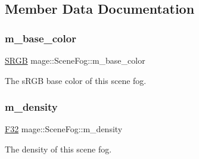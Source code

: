 \subsection{Member Data Documentation}
\hypertarget{classmage_1_1_scene_fog_aa5440867e5dc3dda9532899e98ff44ae}{}\label{classmage_1_1_scene_fog_aa5440867e5dc3dda9532899e98ff44ae} 
\subsubsection{\texorpdfstring{m\+\_\+base\+\_\+color}{m\_base\_color}}
{\footnotesize\ttfamily \hyperlink{structmage_1_1_s_r_g_b}{S\+R\+GB} mage\+::\+Scene\+Fog\+::m\+\_\+base\+\_\+color\hspace{0.3cm}{\ttfamily [private]}}

The s\+R\+GB base color of this scene fog. \hypertarget{classmage_1_1_scene_fog_a16d4e67f373716f100ed6809c387b74c}{}\label{classmage_1_1_scene_fog_a16d4e67f373716f100ed6809c387b74c} 
\subsubsection{\texorpdfstring{m\+\_\+density}{m\_density}}
{\footnotesize\ttfamily \hyperlink{namespacemage_aa97e833b45f06d60a0a9c4fc22ae02c0}{F32} mage\+::\+Scene\+Fog\+::m\+\_\+density\hspace{0.3cm}{\ttfamily [private]}}

The density of this scene fog. 